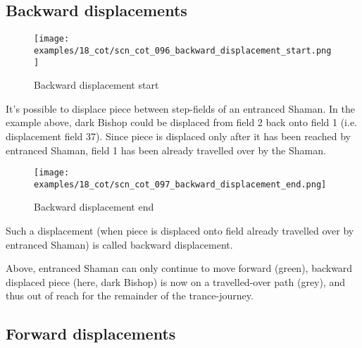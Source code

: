 \subsection*{Backward displacements}
\label{sec:Conquest of Tlalocan/Trance-journey/Backward displacements}

\noindent
\begin{figure}[!h]
\vspace{-1.0\baselineskip}
\texttt{[image: examples/18\_cot/scn\_cot\_096\_backward\_displacement\_start.png]}
\caption{Backward displacement start}
\label{fig:scn_cot_096_backward_displacement_start}
\end{figure}

It's possible to displace piece between step-fields of an entranced Shaman. In the
example above, dark Bishop could be displaced from field 2 back onto field 1 (i.e.
displacement field 37). Since piece is displaced only after it has been reached by
entranced Shaman, field 1 has been already travelled over by the Shaman.

\clearpage %

\noindent
\begin{figure}[!h]
\texttt{[image: examples/18\_cot/scn\_cot\_097\_backward\_displacement\_end.png]}
\caption{Backward displacement end}
\label{fig:scn_cot_097_backward_displacement_end}
\end{figure}

Such a displacement (when piece is displaced onto field already travelled over
by entranced Shaman) is called backward displacement.

Above, entranced Shaman can only continue to move forward (green), backward
displaced piece (here, dark Bishop) is now on a travelled-over path (grey),
and thus out of reach for the remainder of the trance-journey.

\clearpage %

\subsection*{Forward displacements}
\label{sec:Conquest of Tlalocan/Trance-journey/Forward displacements}

